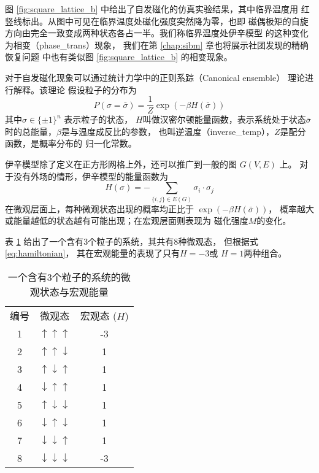 图 \ref{fig:square_lattice_b} 中给出了自发磁化的仿真实验结果，其中临界温度用
红竖线标出。从图中可见在临界温度处磁化强度突然降为零，也即
磁偶极矩的自旋方向由完全一致变成两种状态各占一半。我们称临界温度处伊辛模型
的这种变化为相变（\glsdesc{phase_trans}）现象，
我们在第 \ref{chap:sibm} 章也将展示社团发现的精确恢复问题
中也有类似图 \ref{fig:square_lattice_b} 的相变现象。

对于自发磁化现象可以通过统计力学中的正则系踪（Canonical ensemble）
理论进行解释。该理论
假设粒子的分布为
\begin{equation}\label{eq:canonical_ensemble}
P(\sigma = \bar{\sigma}) = \frac{1}{Z} \exp(-\beta H(\bar{\sigma}))
\end{equation}
其中$\sigma \in \{\pm 1\}^n$ 表示粒子的状态，
$H$叫做汉密尔顿能量函数，表示系统处于状态$\bar{\sigma}$时的总能量，$\beta$是与温度成反比的参数，
也叫逆温度（\glsdesc{inverse_temp}），$Z$是配分函数，是概率分布的
归一化常数。


伊辛模型除了定义在正方形网格上外，还可以推广到一般的图 $G(V, E)$ 上。
对于没有外场的情形，伊辛模型的能量函数为
\begin{equation}\label{eq:hamiltonian}
	H(\sigma) = -\sum_{\{i,j\} \in E(G)} \sigma_i \cdot \sigma_j
\end{equation}
在微观层面上，每种微观状态出现的概率均正比于 $\exp(-\beta H(\bar{\sigma}))$，
概率越大或能量越低的状态越有可能出现；在宏观层面则表现为
磁化强度$M$的变化。

\begin{example}
  表 \ref{tab:particles_3} 给出了一个含有3个粒子的系统，其共有8种微观态，
  但根据式\eqref{eq:hamiltonian}， 其在宏观能量的表现了只有$H=-3$或 $H=1$两种组合。
\begin{table}
  \centering
\begin{tabular}{ccc}
		编号 & 微观态 & 宏观态 ($H$) \\
		1 & $\uparrow\uparrow\uparrow$ & -3 \\
		2 & $\uparrow\uparrow\downarrow$ & 1 \\
		3 & $\uparrow\downarrow\uparrow$ & 1 \\
		4 & $\downarrow\uparrow\uparrow$ & 1 \\
		5 & $\uparrow\downarrow\downarrow$ & 1    \\
6 & $\downarrow\uparrow\downarrow$ & 1 \\
7 & $\downarrow\downarrow\uparrow$ & 1 \\
8 & $\downarrow\downarrow\downarrow$ & -3 \\
\end{tabular}
\caption{一个含有3个粒子的系统的微观状态与宏观能量}
\label{tab:particles_3}
\end{table}
\end{example}

